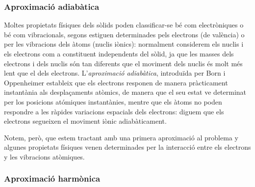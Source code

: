 \documentclass[12pt]{article} %
\begin{document}
{%

\subsubsection{Aproximació adiabàtica}

Moltes propietats físiques dels sòlids poden classificar-se bé com electròniques o bé com vibracionals, segons estiguen determinades pels electrons (de valència) o per les vibracions dels àtoms (nuclis iònics): normalment considerem els nuclis i els electrons com a constituent independents del sòlid, ja que les masses dels electrons i dels nuclis són tan diferents que el moviment dels nuclis és molt més lent que el dels electrons. L'\emph{aproximació adiabàtica}, introduïda per Born i Oppenheimer \cite{ANDP:ANDP19273892002} estableix que els electrons responen de manera pràcticament instantània als desplaçaments atòmics, de manera que el seu estat ve determinat per los posicions atómiques instantànies, mentre que els àtoms no poden respondre a les ràpides variacions espacials dels electrons: diguem que els electrons segueixen el moviment iònic adiabàticament.

Notem, però, que estem tractant amb una primera aproximació al problema y algunes propietats físiques venen determinades per la interacció entre els electrons y les vibracions atòmiques.



  
\subsubsection{Aproximació harmònica}

}
\end{document}
